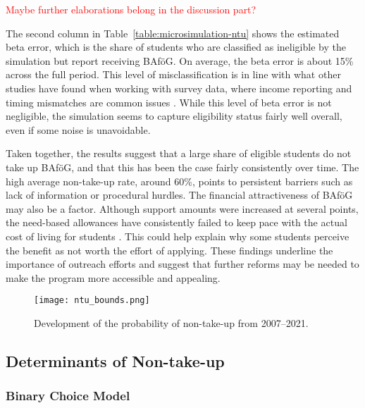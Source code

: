 \textcolor{red}{Maybe further elaborations belong in the discussion part?}

The second column in Table~\ref{table:microsimulation-ntu} shows the estimated beta error, which is the share of students who are classified as ineligible by the simulation but report receiving BAföG. On average, the beta error is about 15\% across the full period. This level of misclassification is in line with what other studies have found when working with survey data, where income reporting and timing mismatches are common issues \citep{frick_claim_2007}. While this level of beta error is not negligible, the simulation seems to capture eligibility status fairly well overall, even if some noise is unavoidable.

Taken together, the results suggest that a large share of eligible students do not take up BAföG, and that this has been the case fairly consistently over time. The high average non-take-up rate, around 60\%, points to persistent barriers such as lack of information or procedural hurdles. The financial attractiveness of BAföG may also be a factor. Although support amounts were increased at several points, the need-based allowances have consistently failed to keep pace with the actual cost of living for students \citep{staack_von_2017}. This could help explain why some students perceive the benefit as not worth the effort of applying. These findings underline the importance of outreach efforts and suggest that further reforms may be needed to make the program more accessible and appealing.




\begin{figure}[htbp]
  \centering
  \texttt{[image: ntu\_bounds.png]}
  \caption{Development of the probability of non-take-up from 2007--2021.}
  \label{fig:ntu_bounds_over_years}
\end{figure}


\subsection{Determinants of Non-take-up}


\subsubsection{Binary Choice Model}

